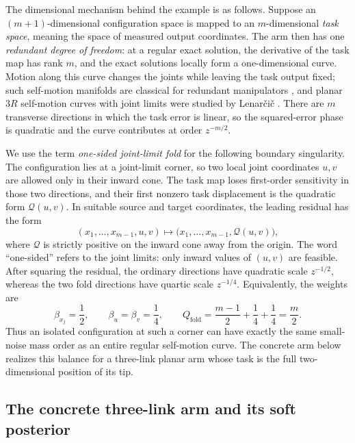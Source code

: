 \documentclass[11pt]{amsart}
\numberwithin{equation}{section}
\theoremstyle{definition}
\theoremstyle{remark}
\begin{document}
The dimensional mechanism behind the example is as follows.  Suppose
an $(m+1)$-dimensional configuration space is mapped to an $m$-dimensional
\emph{task space}, meaning the space of measured output coordinates.  The arm
then has one \emph{redundant degree of freedom}: at a regular exact solution,
the derivative of the task map has rank $m$, and the exact solutions locally
form a one-dimensional curve.  Motion along this curve changes the joints while
leaving the task output fixed; such self-motion manifolds are classical for
redundant manipulators \cite{BurdickSelfMotion}, and planar $3R$ self-motion
curves with joint limits were studied by Lenar\v{c}i\v{c} \cite{Lenarcic3R}.
There are $m$ transverse directions in which the task error is linear, so the
squared-error phase is quadratic and the curve contributes at order $z^{-m/2}$.

We use the term \emph{one-sided joint-limit fold} for the following boundary
singularity.  The configuration lies at a joint-limit corner, so two local
joint coordinates $u,v$ are allowed only in their inward cone.  The task map
loses first-order sensitivity in those two directions, and their first
nonzero task displacement is the quadratic form $\mathcal Q(u,v)$.  In suitable source
and target coordinates, the leading residual has the form
\begin{equation}\label{eq:robot-generic-fold}
 (x_1,\ldots,x_{m-1},u,v)
 \longmapsto
 \bigl(x_1,\ldots,x_{m-1},\mathcal Q(u,v)\bigr),
\end{equation}
where $\mathcal Q$ is strictly positive on the inward cone away from the origin.  The
word ``one-sided'' refers to the joint limits: only inward values of $(u,v)$
are feasible.  After squaring the residual, the ordinary directions have
quadratic scale $z^{-1/2}$, whereas the two fold directions have quartic scale
$z^{-1/4}$.  Equivalently, the weights are
\begin{equation}\label{eq:robot-generic-weights}
 \beta_{x_j}=\frac12,
 \qquad
 \beta_u=\beta_v=\frac14,
 \qquad
 Q_{\mathrm{fold}}
 =\frac{m-1}{2}+\frac14+\frac14
 =\frac m2.
\end{equation}
Thus an isolated configuration at such a corner can have exactly the same
small-noise mass order as an entire regular self-motion curve.  The concrete arm
below realizes this balance for a three-link planar arm whose task is the full
two-dimensional position of its tip.

\subsection{The concrete three-link arm and its soft posterior}
\end{document}

